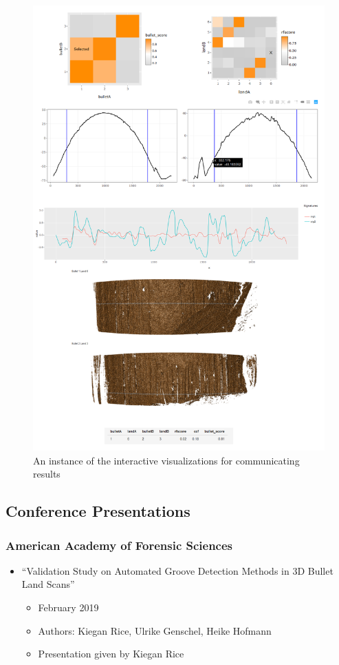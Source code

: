 \documentclass[]{book}
\providecommand{\tightlist}{%
  \setlength{\itemsep}{0pt}\setlength{\parskip}{0pt}}
\begin{document}
\begin{figure}

{\centering \includegraphics[width=0.5\linewidth]{images/bullets/gan-app2_consolidated} 

}

\caption{An instance of the interactive visualizations for communicating results}\label{fig:unnamed-chunk-24}
\end{figure}

\hypertarget{conference-presentations}{%
\subsection{Conference Presentations}\label{conference-presentations}}

\hypertarget{american-academy-of-forensic-sciences}{%
\subsubsection{American Academy of Forensic Sciences}\label{american-academy-of-forensic-sciences}}

\begin{itemize}
\item
  ``Validation Study on Automated Groove Detection Methods in 3D Bullet Land Scans''

  \begin{itemize}
  \tightlist
  \item
    February 2019\\
  \item
    Authors: Kiegan Rice, Ulrike Genschel, Heike Hofmann
  \item
    Presentation given by Kiegan Rice
  \end{itemize}
\end{itemize}
\end{document}
